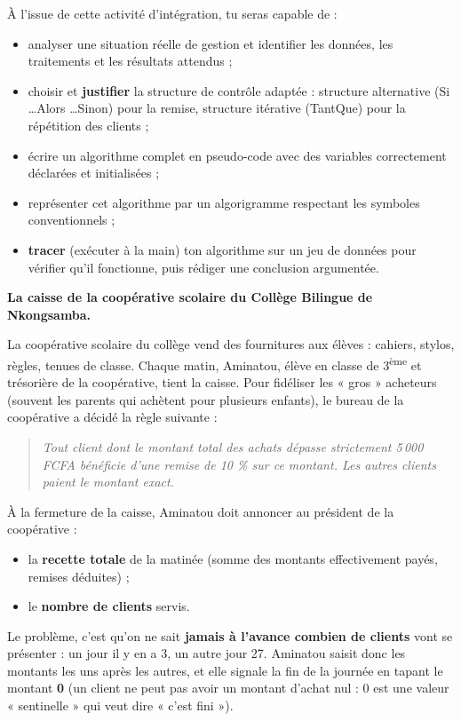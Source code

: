 \documentclass[11pt]{article}
\newcommand{\cle}[1]{{\popxbold\color{popdark}#1}}
\newcounter{popsec}
\newcounter{popsub}
\newcommand{\courssub}[1]{%
  \stepcounter{popsub}%
  \par\vspace{9pt}\noindent{\popxbold\fontsize{11.5}{13}\selectfont\color{popink}{\color{poporange}\thepopsec.\thepopsub}\hspace{6pt}#1}\par\nopagebreak\vspace{4pt}
}
\begin{document}
À l'issue de cette activité d'intégration, tu seras capable de :
\begin{itemize}
\item analyser une situation réelle de gestion et identifier les \cle{données}, les \cle{traitements} et les \cle{résultats} attendus ;
\item choisir et \textbf{justifier} la structure de contrôle adaptée : \cle{structure alternative} (Si \ldots Alors \ldots Sinon) pour la remise, \cle{structure itérative} (TantQue) pour la répétition des clients ;
\item écrire un algorithme complet en \cle{pseudo-code} avec des variables correctement déclarées et initialisées ;
\item représenter cet algorithme par un \cle{algorigramme} respectant les symboles conventionnels ;
\item \textbf{tracer} (exécuter à la main) ton algorithme sur un jeu de données pour vérifier qu'il fonctionne, puis rédiger une conclusion argumentée.
\end{itemize}

\courssub{Situation}

\textbf{La caisse de la coopérative scolaire du Collège Bilingue de Nkongsamba.}

La coopérative scolaire du collège vend des fournitures aux élèves : cahiers, stylos, règles, tenues de classe. Chaque matin, Aminatou, élève en classe de 3\textsuperscript{ème} et trésorière de la coopérative, tient la caisse. Pour fidéliser les « gros » acheteurs (souvent les parents qui achètent pour plusieurs enfants), le bureau de la coopérative a décidé la règle suivante :

\begin{quote}
\emph{Tout client dont le montant total des achats dépasse strictement 5\,000 FCFA bénéficie d'une remise de 10 \% sur ce montant. Les autres clients paient le montant exact.}
\end{quote}

À la fermeture de la caisse, Aminatou doit annoncer au président de la coopérative :
\begin{itemize}
\item la \textbf{recette totale} de la matinée (somme des montants effectivement payés, remises déduites) ;
\item le \textbf{nombre de clients} servis.
\end{itemize}

Le problème, c'est qu'on ne sait \textbf{jamais à l'avance combien de clients} vont se présenter : un jour il y en a 3, un autre jour 27. Aminatou saisit donc les montants les uns après les autres, et elle signale la fin de la journée en tapant le montant \textbf{0} (un client ne peut pas avoir un montant d'achat nul : 0 est une valeur « sentinelle » qui veut dire « c'est fini »).
\end{document}
